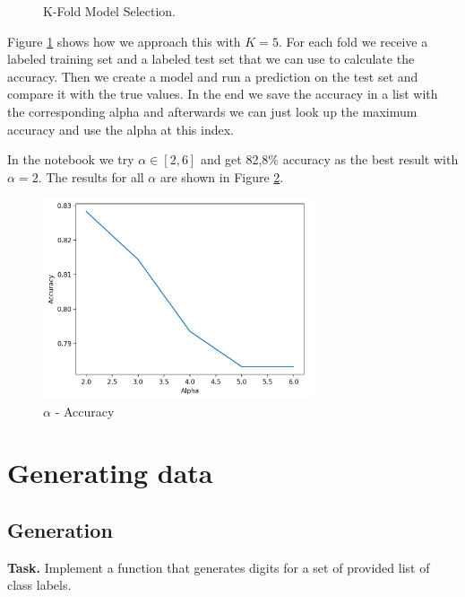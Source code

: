 \documentclass{support/acm_proc_article-sp}
\begin{document}
    \begin{figure}[htbp]
        \centering
        \lstset{numbers=none,xleftmargin=0em}
        
        \caption{K-Fold Model Selection.}
        \label{fig:k-fold}
    \end{figure}
    Figure \ref{fig:k-fold} shows how we approach this with $K = 5$.
    For each fold we receive a labeled training set and a labeled test set that we can use to calculate the accuracy.
    Then we create a model and run a prediction on the test set and compare it with the true values.
    In the end we save the accuracy in a list with the corresponding alpha and afterwards we can just look up the
    maximum accuracy and use the alpha at this index.

    In the notebook we try $\alpha \in [2, 6]$ and get 82,8\% accuracy as the best result with $\alpha = 2$.
    The results for all $\alpha$ are shown in Figure \ref{fig:k-fold-accuracy}.
    \begin{figure}[!htbp]
        \centering
        \includegraphics[width=8cm]{images/k-fold.png}
        \caption{$\alpha$ - Accuracy}
        \label{fig:k-fold-accuracy}
    \end{figure}


    \section{Generating data}

    \subsection{Generation}

    \textbf{Task.} Implement a function that generates digits for a set of provided list of class labels.
\end{document}
